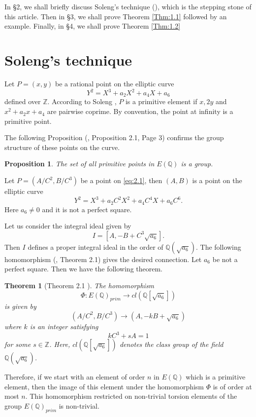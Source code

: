\documentclass[12pt, 14paper]{amsart}
\theoremstyle{plain}
\newtheorem{theorem}[subsection]{Theorem}
\newtheorem{proposition}[subsection]{Proposition}
\numberwithin{equation}{section}
\newcommand \ZZ {{\mathbb Z}}
\newcommand \QQ {{\mathbb Q}}
\begin{document}
In \S 2, we shall briefly discuss Soleng's technique (\cite{S}), which is the stepping stone of this article. Then in \S 3, we shall prove Theorem \eqref{Thm:1.1} followed by an example. Finally, in \S 4, we shall prove Theorem \eqref{Thm:1.2}


\section{Soleng's technique}
Let $P=(x,y)$ be a rational point on the elliptic curve 
\begin{equation}
\label{eq:2.1}
    Y^2=X^3+a_2X^2+a_4X+a_6 
\end{equation}
defined over $\ZZ$. According to Soleng \cite{S}, $P$ is a primitive element if $x,2y$ and $x^2+a_2x+a_4$ are pairwise coprime. By convention, the point at infinity is a primitive point.

The following Proposition (\cite{S}, Proposition 2.1, Page 3) confirms the group structure of these points on the curve.
\begin{proposition}
\label{prop:1}
The set of all primitive points in $E(\QQ)$ is a group. 
\end{proposition}
Let $P=(A/C^2, B/C^3)$ be a point on \eqref{eq:2.1}, then $(A,B)$ is a point on the elliptic curve 
$$
Y^2=X^3+a_2C^2X^2+a_4C^4X+a_6C^6.
$$
Here $a_6\neq 0$ and it is not a perfect square.


Let us consider the integral ideal given by 
$$
I=[A,-B+C^3\sqrt{a_6}].
$$
 Then $I$ defines a proper integral ideal in the order of $\QQ(\sqrt{a_6})$.
The following homomorphism (\cite{S}, Theorem 2.1) gives the desired connection. Let $a_6$ be not a perfect square. Then we have the following theorem.

\begin{theorem}[Theorem 2.1 \cite{S}]\label{thm2}
The homomorphism 
    $$\Phi: E(\QQ)_{prim}\to cl(\QQ[\sqrt{a_6}])$$
is given by 
$$(A/C^2, B/C^3)\to (A,-kB+\sqrt{a_6})$$
where $k$ is an integer satisfying 
$$
kC^3+sA=1
$$
for some $s\in \ZZ$. Here, $cl(\QQ[\sqrt{a_6}])$ denotes the class group of the field $\QQ(\sqrt{a_6})$.
\end{theorem}

Therefore, if we start with an element of order $n$ in $E(\QQ)$ which is a primitive element, then the image of this element under the homomorphism $\Phi$ is of order at most $n$. This homomorphism restricted on non-trivial torsion elements of the group $E(\QQ)_{prim}$  is non-trivial.
\end{document}
